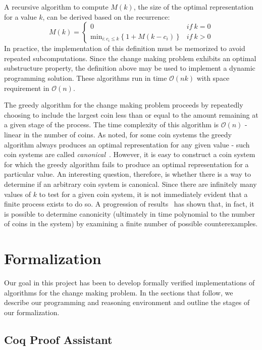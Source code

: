 \documentclass{acm_proc_article-sp}
\begin{document}
A recursive algorithm to compute $M(k)$, the size of the optimal representation for a value $k$, can be derived based on the recurrence:
\[
M(k) = \left\{ 
	\begin{array}{lr}
	0 & \textit{if}~k=0\\
	\textrm{min}_{i:c_i \le k}\left\{1 + M(k - c_i)\right\}   & \textit{if}~k>0
	\end{array}\right.
\]
In practice, the implementation of this definition must be memorized to avoid repeated subcomputations. Since the change making problem exhibits an optimal substructure property, the definition above may be used to implement a dynamic programming solution. These algorithms run in time $\mathcal{O}(nk)$ with space requirement in $\mathcal{O}(n)$. 


The greedy algorithm for the change making problem proceeds by repeatedly choosing to include the largest coin less than or equal to the amount remaining at a given stage of the process. The time complexity of this algorithm is $\mathcal{O}(n)$ - linear in the number of coins.  As noted, for some coin systems the greedy algorithm always produces an optimal representation for any given value - such coin systems are called \emph{canonical}~\cite{martello90}. However, it is easy to construct a coin system for which the greedy algorithm fails to produce an optimal representation for a particular value. An interesting question, therefore, is whether there is a way to determine if an arbitrary coin system is canonical. Since there are infinitely many values of $k$ to test for a given coin system, it is not immediately evident that a finite process exists to do so. A progression of results~\cite{chang70,kozen94,pearson94} has shown that, in fact, it is possible to determine canonicity (ultimately in time polynomial to the number of coins in the system) by examining a finite number of possible counterexamples. 


\section{Formalization}

Our goal in this project has been to develop formally verified implementations of algorithms for the change making problem. In the sections that follow, we describe our programming and reasoning environment and outline the stages of our formalization. 

\subsection{Coq Proof Assistant}
\end{document}
